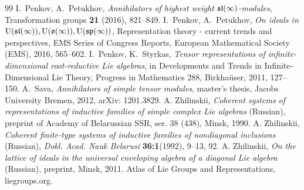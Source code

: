 \documentclass[10pt]{amsart}\oddsidemargin -1mm \evensidemargin -1mm \topmargin -15mm\headheight5mm \headsep 3.5mm \textheight 245mm\textwidth 170mm %
\begin{document}
\begin{thebibliography}{99}
 I.~Penkov, A.~Petukhov, {\it Annihilators of highest weight $\frak{sl}(\infty)$-modules}, Transformation groups {\bf 21} (2016), 821--849.
 I.~Penkov, A.~Petukhov, {\it On ideals  in $\operatorname{\mathrm{U}}(\frak{sl}(\infty)), \operatorname{\mathrm{U}}(\frak{o}(\infty)), \operatorname{\mathrm{U}}(\frak{sp}(\infty))$}, Representation theory - current trends and perspectives, EMS Series of Congress Reports, European Mathematical Society (EMS), 2016, 565--602.
 I.~Penkov, K.~Styrkas, {\it Tensor representations of infinite-dimensional root-reductive Lie algebras}, in Developments and Trends in Infinite-Dimensional Lie Theory, Progress in Mathematics 288, Birkha\"user, 2011, 127--150.
 A.~Sava, {\it Annihilators of simple tensor modules}, master’s thesis, Jacobs University Bremen, 2012, arXiv: 1201.3829.
 A. Zhilinskii, {\it Coherent systems of representations of inductive families of simple complex Lie algebras} (Russian), preprint of Academy of Belarussian SSR, ser. 38 (438), Minsk, 1990.
 A. Zhilinskii, {\it Coherent finite-type systems of inductive families of nondiagonal inclusions} (Russian), {\it Dokl. Acad. Nauk Belarusi} {\bf 36:1}(1992), 9--13, 92.
 A. Zhilinskii, {\it On the lattice of ideals in the universal enveloping algebra of a diagonal Lie algebra} (Russian), preprint, Minsk, 2011.
 Atlas of Lie Groups and Representations, liegroups.org.
\end{thebibliography}
\end{document}
